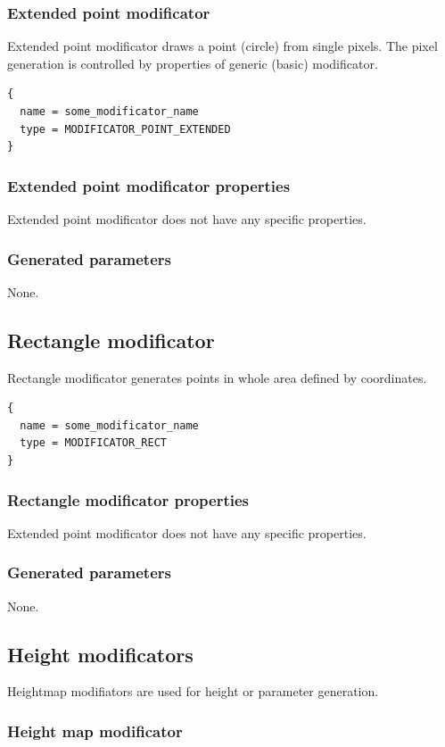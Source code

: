 \documentclass[9pt]{article}
\begin{document}
\subsubsection{Extended point modificator}

Extended point modificator draws a point (circle)
from single pixels. The pixel generation is controlled by 
properties of generic (basic) modificator.
\begin{verbatim}
{
  name = some_modificator_name
  type = MODIFICATOR_POINT_EXTENDED
}
\end{verbatim}
\subsubsection*{Extended point modificator properties}
Extended point modificator does not have any specific properties.
\subsubsection*{Generated parameters}

None.

\subsection{Rectangle modificator}

Rectangle modificator generates points in whole area defined by coordinates.
\begin{verbatim}
{
  name = some_modificator_name
  type = MODIFICATOR_RECT
}
\end{verbatim}
\subsubsection*{Rectangle modificator properties}
Extended point modificator does not have any specific properties.
\subsubsection*{Generated parameters}

None.

\subsection{Height modificators}

Heightmap modifiators are used for height or parameter generation.

\subsubsection{Height map modificator}
\end{document}
